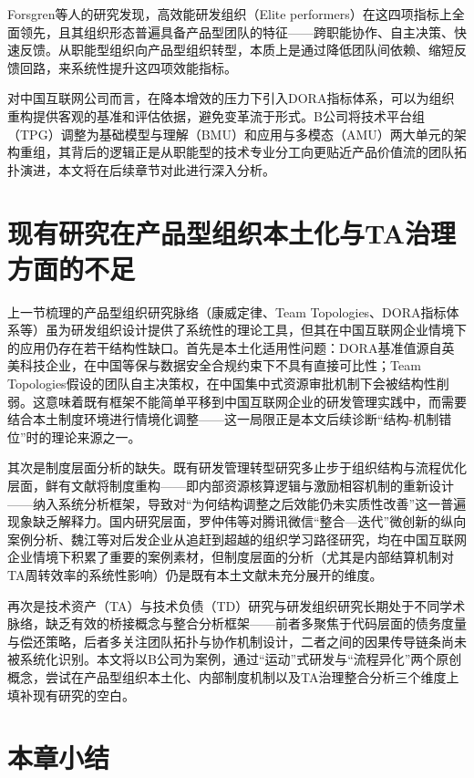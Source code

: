 Forsgren等人的研究发现，高效能研发组织（Elite performers）在这四项指标上全面领先，且其组织形态普遍具备产品型团队的特征——跨职能协作、自主决策、快速反馈。从职能型组织向产品型组织转型，本质上是通过降低团队间依赖、缩短反馈回路，来系统性提升这四项效能指标。

对中国互联网公司而言，在降本增效的压力下引入DORA指标体系，可以为组织重构提供客观的基准和评估依据，避免变革流于形式。B公司将技术平台组（TPG）调整为基础模型与理解（BMU）和应用与多模态（AMU）两大单元的架构重组，其背后的逻辑正是从职能型的技术专业分工向更贴近产品价值流的团队拓扑演进，本文将在后续章节对此进行深入分析。

\section{现有研究在产品型组织本土化与TA治理方面的不足}

上一节梳理的产品型组织研究脉络（康威定律、Team Topologies、DORA指标体系等）虽为研发组织设计提供了系统性的理论工具，但其在中国互联网企业情境下的应用仍存在若干结构性缺口。首先是本土化适用性问题：DORA基准值源自英美科技企业，在中国等保与数据安全合规约束下不具有直接可比性；Team Topologies假设的团队自主决策权，在中国集中式资源审批机制下会被结构性削弱。这意味着既有框架不能简单平移到中国互联网企业的研发管理实践中，而需要结合本土制度环境进行情境化调整——这一局限正是本文后续诊断“结构-机制错位”时的理论来源之一。

其次是制度层面分析的缺失。既有研发管理转型研究多止步于组织结构与流程优化层面，鲜有文献将制度重构——即内部资源核算逻辑与激励相容机制的重新设计——纳入系统分析框架，导致对“为何结构调整之后效能仍未实质性改善”这一普遍现象缺乏解释力。国内研究层面，罗仲伟等\cite{luo2014weixin}对腾讯微信“整合—迭代”微创新的纵向案例分析、魏江等\cite{wei2014catchup}对后发企业从追赶到超越的组织学习路径研究，均在中国互联网企业情境下积累了重要的案例素材，但制度层面的分析（尤其是内部结算机制对TA周转效率的系统性影响）仍是既有本土文献未充分展开的维度。

再次是技术资产（TA）与技术负债（TD）研究与研发组织研究长期处于不同学术脉络，缺乏有效的桥接概念与整合分析框架——前者多聚焦于代码层面的债务度量与偿还策略，后者多关注团队拓扑与协作机制设计，二者之间的因果传导链条尚未被系统化识别。本文将以B公司为案例，通过“运动”式研发与“流程异化”两个原创概念，尝试在产品型组织本土化、内部制度机制以及TA治理整合分析三个维度上填补现有研究的空白。

\section{本章小结}

